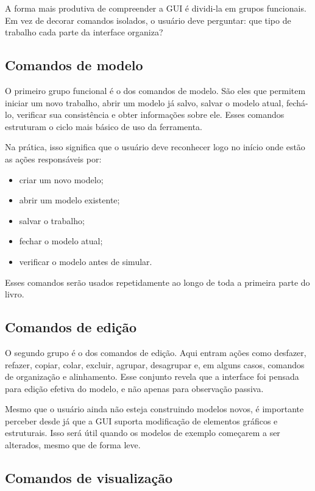 A forma mais produtiva de compreender a GUI é dividi-la em grupos funcionais. Em vez de decorar comandos isolados, o usuário deve perguntar: que tipo de trabalho cada parte da interface organiza?

\subsection{Comandos de modelo}
\label{subsec:cap3_comandos_modelo}

O primeiro grupo funcional é o dos comandos de modelo. São eles que permitem iniciar um novo trabalho, abrir um modelo já salvo, salvar o modelo atual, fechá-lo, verificar sua consistência e obter informações sobre ele. Esses comandos estruturam o ciclo mais básico de uso da ferramenta.

Na prática, isso significa que o usuário deve reconhecer logo no início onde estão as ações responsáveis por:
\begin{itemize}
    \item criar um novo modelo;
    \item abrir um modelo existente;
    \item salvar o trabalho;
    \item fechar o modelo atual;
    \item verificar o modelo antes de simular.
\end{itemize}

Esses comandos serão usados repetidamente ao longo de toda a primeira parte do livro.

\subsection{Comandos de edição}
\label{subsec:cap3_comandos_edicao}

O segundo grupo é o dos comandos de edição. Aqui entram ações como desfazer, refazer, copiar, colar, excluir, agrupar, desagrupar e, em alguns casos, comandos de organização e alinhamento. Esse conjunto revela que a interface foi pensada para edição efetiva do modelo, e não apenas para observação passiva.

Mesmo que o usuário ainda não esteja construindo modelos novos, é importante perceber desde já que a GUI suporta modificação de elementos gráficos e estruturais. Isso será útil quando os modelos de exemplo começarem a ser alterados, mesmo que de forma leve.

\subsection{Comandos de visualização}
\label{subsec:cap3_comandos_visualizacao}


